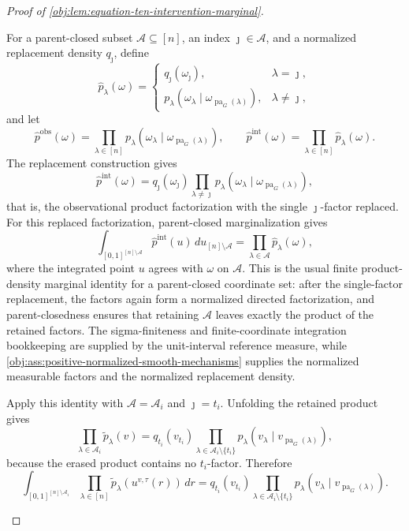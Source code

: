 \begin{proof}[Proof of \cref{obj:lem:equation-ten-intervention-marginal}]
\begin{enumerate}
For a parent-closed subset \(\mathcal A\subseteq[n]\), an index \(\jmath\in\mathcal A\), and a normalized replacement density \(q_{\jmath}\), define
\[
\widehat p_\lambda(\omega)=
\begin{cases}
q_{\jmath}(\omega_{\jmath}), & \lambda=\jmath,\\
p_\lambda\!\left(\omega_\lambda\mid
\omega_{\operatorname{pa}_G(\lambda)}\right), & \lambda\ne\jmath,
\end{cases}
\]
and let
\[
\widehat p^{\mathrm{obs}}(\omega)
=
\prod_{\lambda\in[n]}
p_\lambda\!\left(\omega_\lambda\mid
\omega_{\operatorname{pa}_G(\lambda)}\right),
\qquad
\widehat p^{\mathrm{int}}(\omega)
=
\prod_{\lambda\in[n]}\widehat p_\lambda(\omega).
\]
The replacement construction gives
\[
\widehat p^{\mathrm{int}}(\omega)
=
q_{\jmath}(\omega_{\jmath})
\prod_{\lambda\ne\jmath}
p_\lambda\!\left(\omega_\lambda\mid
\omega_{\operatorname{pa}_G(\lambda)}\right),
\]
that is, the observational product factorization with the single \(\jmath\)-factor replaced. For this replaced factorization, parent-closed marginalization gives
\[
\int_{[0,1]^{[n]\setminus\mathcal A}}
\widehat p^{\mathrm{int}}(u)\,du_{[n]\setminus\mathcal A}
=
\prod_{\lambda\in\mathcal A}\widehat p_\lambda(\omega),
\]
where the integrated point \(u\) agrees with \(\omega\) on \(\mathcal A\). This is the usual finite product-density marginal identity for a parent-closed coordinate set: after the single-factor replacement, the factors again form a normalized directed factorization, and parent-closedness ensures that retaining \(\mathcal A\) leaves exactly the product of the retained factors. The sigma-finiteness and finite-coordinate integration bookkeeping are supplied by the unit-interval reference measure, while \cref{obj:ass:positive-normalized-smooth-mechanisms} supplies the normalized measurable factors and the normalized replacement density.

Apply this identity with \(\mathcal A=\mathcal A_i\) and \(\jmath=t_i\). Unfolding the retained product gives
\[
\prod_{\lambda\in\mathcal A_i}\widetilde p_\lambda(v)
=
q_{t_i}(v_{t_i})
\prod_{\lambda\in\mathcal A_i\setminus\{t_i\}}
p_\lambda\!\left(v_\lambda\mid v_{\operatorname{pa}_G(\lambda)}\right),
\]
because the erased product contains no \(t_i\)-factor. Therefore
\[
\int_{[0,1]^{[n]\setminus\mathcal A_i}}
\prod_{\lambda\in[n]}\widetilde p_\lambda(u^{v,\tau}(r))\,dr
=
q_{t_i}(v_{t_i})
\prod_{\lambda\in\mathcal A_i\setminus\{t_i\}}
p_\lambda\!\left(v_\lambda\mid v_{\operatorname{pa}_G(\lambda)}\right).
\] %


\end{enumerate}
\end{proof}
